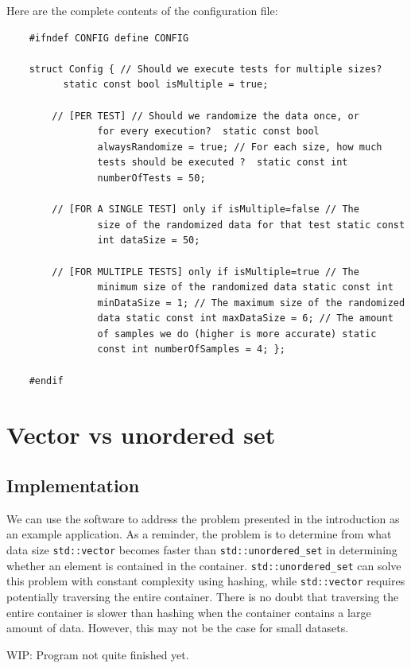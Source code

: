 \documentclass[conference]{IEEEtran} \IEEEoverridecommandlockouts
\def\code#1{\texttt{#1}}
\begin{document}
Here are the complete contents of the configuration file:
\begin{lstlisting}
	#ifndef CONFIG define CONFIG
	
	struct Config { // Should we execute tests for multiple sizes?
          static const bool isMultiple = true;
		
		// [PER TEST] // Should we randomize the data once, or
                for every execution?  static const bool
                alwaysRandomize = true; // For each size, how much
                tests should be executed ?  static const int
                numberOfTests = 50;
		
		// [FOR A SINGLE TEST] only if isMultiple=false // The
                size of the randomized data for that test static const
                int dataSize = 50;
		
		// [FOR MULTIPLE TESTS] only if isMultiple=true // The
                minimum size of the randomized data static const int
                minDataSize = 1; // The maximum size of the randomized
                data static const int maxDataSize = 6; // The amount
                of samples we do (higher is more accurate) static
                const int numberOfSamples = 4; };
	
	#endif
\end{lstlisting}

\section{Vector vs unordered set}

\subsection{Implementation}

We can use the software to address the problem presented in the
introduction as an example application. As a reminder, the problem is
to determine from what data size \code{std::vector} becomes faster
than \code{std::unordered\_set} in determining whether an element is
contained in the container. \code{std::unordered\_set} can solve this
problem with constant complexity using hashing, while
\code{std::vector} requires potentially traversing the entire
container. There is no doubt that traversing the entire container is
slower than hashing when the container contains a large amount of
data. However, this may not be the case for small datasets.

WIP: Program not quite finished yet.
\end{document}
